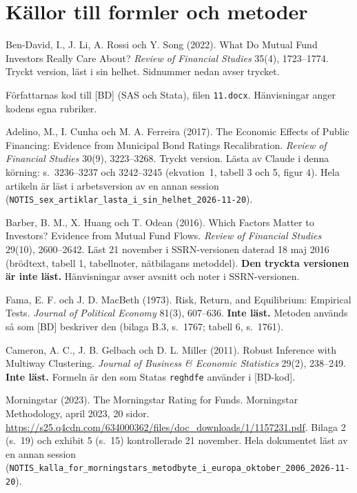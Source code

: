 \documentclass[10pt,a4paper]{article}
\newcommand{\kod}[1]{\texttt{#1}}
\begin{document}
\section{Källor till formler och metoder}\label{sec:kallor}
\begin{description}[leftmargin=1.6cm,style=nextline,itemsep=2pt]
\item[{[BD]}] Ben-David, I., J. Li, A. Rossi och Y. Song (2022). What Do Mutual Fund Investors Really Care About? \textit{Review of Financial Studies} 35(4), 1723--1774. Tryckt version, läst i sin helhet. Sidnummer nedan avser trycket.
\item[{[BD-kod]}] Författarnas kod till [BD] (SAS och Stata), filen \kod{11.docx}. Hänvisningar anger kodens egna rubriker.
\item[{[ACF]}] Adelino, M., I. Cunha och M. A. Ferreira (2017). The Economic Effects of Public Financing: Evidence from Municipal Bond Ratings Recalibration. \textit{Review of Financial Studies} 30(9), 3223--3268. Tryckt version. Lästa av Claude i denna körning: s.~3236--3237 och 3242--3245 (ekvation~1, tabell 3 och 5, figur 4). Hela artikeln är läst i arbetsversion av en annan session (\kod{NOTIS\_sex\_artiklar\_lasta\_i\_sin\_helhet\_2026-11-20}).
\item[{[BHO]}] Barber, B. M., X. Huang och T. Odean (2016). Which Factors Matter to Investors? Evidence from Mutual Fund Flows. \textit{Review of Financial Studies} 29(10), 2600--2642. Läst 21 november i SSRN-versionen daterad 18 maj 2016 (brödtext, tabell 1, tabellnoter, nätbilagans metoddel). \textbf{Den tryckta versionen är inte läst.} Hänvisningar avser avsnitt och noter i SSRN-versionen.
\item[{[FM]}] Fama, E. F. och J. D. MacBeth (1973). Risk, Return, and Equilibrium: Empirical Tests. \textit{Journal of Political Economy} 81(3), 607--636. \textbf{Inte läst.} Metoden används så som [BD] beskriver den (bilaga B.3, s.~1767; tabell 6, s.~1761).
\item[{[CGM]}] Cameron, A. C., J. B. Gelbach och D. L. Miller (2011). Robust Inference with Multiway Clustering. \textit{Journal of Business \& Economic Statistics} 29(2), 238--249. \textbf{Inte läst.} Formeln är den som Statas \kod{reghdfe} använder i [BD-kod].
\item[{[MS]}] Morningstar (2023). The Morningstar Rating for Funds. Morningstar Methodology, april 2023, 20 sidor. \url{https://s25.q4cdn.com/634000362/files/doc_downloads/1/1157231.pdf}. Bilaga 2 (s.~19) och exhibit 5 (s.~15) kontrollerade 21 november. Hela dokumentet läst av en annan session (\kod{NOTIS\_kalla\_for\_morningstars\_metodbyte\_i\_europa\_oktober\_2006\_2026-11-20}).
\end{description}
\end{document}
